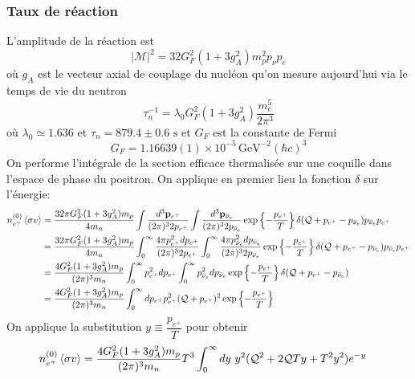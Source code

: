 \documentclass{article}
\numberwithin{equation}{section}
\begin{document}
\subsubsection{Taux de réaction}
L'amplitude de la réaction est
\begin{equation}\label{eq:AmpReaction} 
        |\mathcal{M}|^{2} = 32 G_F^2(1 + 3g_A^2)m_p^2p_{\nu}p_e
\end{equation} 
où $g_A$ est le vecteur axial de couplage du nucléon qu'on mesure 
aujourd'hui via le temps de vie du neutron
\[
        \tau_n^{-1} = \lambda_0G_F^2(1 + 3g_A^2) \frac{m_e^5}{2\pi^3}
\]
où $\lambda_0 \simeq 1.636$ et $\tau_n = 879.4 \pm 0.6\,\, \text{s}$ et 
$G_F$ est la constante de Fermi
\[
        G_F = 1.16639(1) \times 10^{-5}\, \text{GeV}^{-2} (\hbar c)^{3}
\]
On performe 
l'intégrale de la section efficace thermalisée sur une 
coquille dans l'espace de phase du positron. On applique en 
premier lieu la fonction $\delta $ sur l'énergie:
\begingroup
\allowdisplaybreaks
\begin{align*}
        n_{e^{+}}^{(0)}\expval{\sigma v} &= 
        \frac{32\pi G_F^2(1 + 3g_A^2) m_p}{ 4m_n}
        \int \frac{d^{3}\mathbf{p}_{e^{+}}}{(2\pi)^{3}2p_{e^{+}}}
        \int \frac{d^{3}\mathbf{p}_{\bar{\nu}_e}}{(2\pi)^{3}2p_{\bar{\nu}_e}}
        \exp \left\{ - \frac{p_{e^{+}}}{T} \right\}
        \delta(\mathcal{Q} + p_{e^{+}} - p_{\bar{\nu}_e})
        p_{\bar{\nu}_e} p_{e^{+}} \\
        &= 
        \frac{32\pi G_F^2(1 + 3g_A^2) m_p}{ 4m_n}
        \int_0^{\infty } \frac{4 \pi p^2_{e^{+}} dp_{e^{+}}}{(2\pi)^{3}2p_{e^{+}}}
        \int_0^{\infty } \frac{4 \pi p^2_{\bar{\nu}_e} dp_{\bar{\nu}_e}}{(2\pi)^{3}2p_{\bar{\nu}_e}}
        \exp \left\{ - \frac{p_{e^{+}}}{T} \right\}
        \delta(\mathcal{Q} + p_{e^{+}} - p_{\bar{\nu}_e})
        p_{\bar{\nu}_e} p_{e^{+}} \\
        &= 
        \frac{4 G_F^2(1 + 3g_A^2) m_p}{ (2\pi)^{3}m_n}
        \int_0^{\infty }  p^2_{e^{+}} dp_{e^{+}}
        \int_0^{\infty }  p^2_{\bar{\nu}_e} dp_{\bar{\nu}_e}
        \exp \left\{ - \frac{p_{e^{+}}}{T} \right\}
        \delta(\mathcal{Q} + p_{e^{+}} - p_{\bar{\nu}_e})
        \\
        &= 
        \frac{4 G_F^2(1 + 3g_A^2) m_p}{ (2\pi)^{3}m_n}
        \int_0^{\infty }  dp_{e^{+}} p^2_{e^{+}} 
        (\mathcal{Q} + p_{e^{+}})^2
        \exp \left\{ - \frac{p_{e^{+}}}{T} \right\}
\end{align*}
\endgroup
On applique la substitution $y \equiv \dfrac{p_{e^{+}}}{T}$ pour obtenir
\begin{align*}
        n_{e^{+}}^{(0)}\expval{\sigma v} &= 
        \frac{4 G_F^2(1 + 3g_A^2) m_p}{ (2\pi)^{3}m_n}T^3
        \int_0^{\infty }  dy\,\, y^2  (\mathcal{Q}^2 + 2\mathcal{Q}Ty + T^2y^2)
        e^{-y}
\end{align*}
\end{document}
